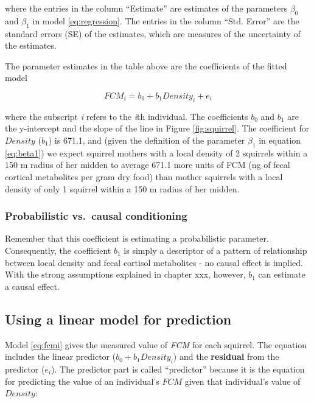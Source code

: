 \documentclass[]{book}
\begin{document}
where the entries in the column ``Estimate'' are estimates of the
parameters \(\beta_0\) and \(\beta_1\) in model \eqref{eq:regression}. The
entries in the column ``Std. Error'' are the standard errors (SE) of the
estimates, which are measures of the uncertainty of the estimates.

The parameter estimates in the table above are the coefficients of the
fitted model

\begin{equation}
FCM_i = b_0 + b_1 Density_i + e_i
\label{eq:fcmi}
\end{equation}

where the subscript \emph{i} refers to the \emph{i}th individual. The
coefficients \(b_0\) and \(b_1\) are the y-intercept and the slope of
the line in Figure \ref{fig:squirrel}. The coefficient for \(Density\)
(\(b_1\)) is 671.1, and (given the definition of the parameter
\(\beta_1\) in equation \eqref{eq:beta1}) we expect squirrel mothers with
a local density of 2 squirrels within a 150 m radius of her midden to
average 671.1 more units of FCM (ng of fecal cortical metabolites per
gram dry food) than mother squirrels with a local density of only 1
squirrel within a 150 m radius of her midden.

\subsubsection{Probabilistic vs.~causal
conditioning}\label{probabilistic-vs.causal-conditioning}

Remember that this coefficient is estimating a probabilistic parameter.
Consequently, the coefficient \(b_1\) is simply a descriptor of a
pattern of relationship between local density and fecal cortisol
metabolites - no causal effect is implied. With the strong assumptions
explained in chapter xxx, however, \(b_1\) can estimate a causal effect.

\subsection{Using a linear model for
prediction}\label{using-a-linear-model-for-prediction}

Model \eqref{eq:fcmi} gives the measured value of \emph{FCM} for each
squirrel. The equation includes the linear predictor
(\(b_0 + b_1 Density_i\)) and the \textbf{residual} from the predictor
(\(e_i\)). The predictor part is called ``predictor'' because it is the
equation for predicting the value of an individual's \(FCM\) given that
individual's value of \(Density\):
\end{document}
